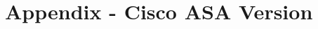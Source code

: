 \documentclass[12pt]{article}
\begin{document}
\pagebreak








\pagebreak


\appendix

\section{Appendix - Cisco ASA Version}
\label{AppendixCiscoVer}

\vspace{-5pt}
\end{document}
